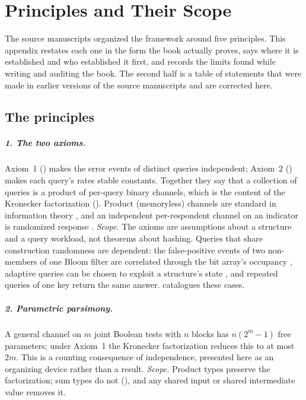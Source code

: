 \chapter{Principles and Their Scope}
\label{app:principles}

The source manuscripts organized the framework around five principles. This
appendix restates each one in the form the book actually proves, says where it
is established and who established it first, and records the limits found while
writing and auditing the book. The second half is a table of statements that
were made in earlier versions of the source manuscripts and are corrected here.

\section*{The principles}

\paragraph{1. The two axioms.}
Axiom~1 () makes the error events of distinct queries
independent; Axiom~2 () makes each query's rates
stable constants. Together they say that a collection of queries is a product
of per-query binary channels, which is the content of the Kronecker
factorization (). Product (memoryless) channels are
standard in information theory \parencite{cover-thomas}, and an independent
per-respondent channel on an indicator is randomized response
\parencite{warner-1965}. \emph{Scope.} The axioms are assumptions about a
structure and a query workload, not theorems about hashing. Queries that share
construction randomness are dependent: the false-positive events of two
non-members of one Bloom filter are correlated through the bit array's
occupancy \parencite{bose-et-al-2008}, adaptive queries can be chosen to
exploit a structure's state \parencite{naor-yogev-2015}, and repeated queries of
one key return the same answer.  catalogues these cases.

\paragraph{2. Parametric parsimony.}
A general channel on $m$ joint Boolean tests with $n$ blocks has $n(2^m - 1)$
free parameters; under Axiom~1 the Kronecker factorization reduces this to at
most $2m$. This is a counting consequence of independence, presented here as an
organizing device rather than a result. \emph{Scope.} Product types preserve
the factorization; sum types do not (), and any shared
input or shared intermediate value removes it.

